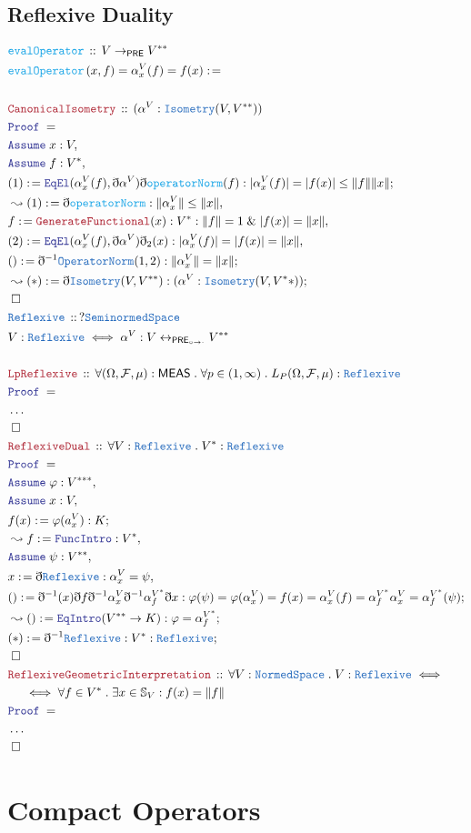 \documentclass[12pt]{scrartcl}
\newcommand{\TYPE}[1]{\textcolor{NavyBlue}{\mathtt{#1}}}
\newcommand{\FUNC}[1]{\textcolor{Cerulean}{\mathtt{#1}}}
\newcommand{\LOGIC}[1]{\textcolor{Blue}{\mathtt{#1}}}
\newcommand{\THM}[1]{\textcolor{Maroon}{\mathtt{#1}}}
\renewcommand{\.}{\; . \;}
\newcommand{\de}{: \kern 0.1pc =}
\newcommand{\Act}[1]{\left( #1 \right)}
\newcommand{\Theorem}[2]{& \THM{#1} \, :: \, #2 \\ & \Proof = \\ }
\newcommand{\DeclareType}[2]{& \TYPE{#1} \, :: \, #2 \\}
\newcommand{\DefineType}[3]{& #1 : \TYPE{#2} \iff #3 \\}
\newcommand{\DeclareFunc}[2]{& \FUNC{#1} \, :: \, #2 \\}
\newcommand{\DefineNamedFunc}[4]{&  \FUNC{#1}\Act{#2} = #3 \de #4 \\}
\newcommand{\NewLine}{\\ & \kern 1pc}
\newcommand{\Page}[1]{\begin{align*} #1 \end{align*} \newpage   }
\newcommand{ \bd }{ \ByDef }
\newcommand{\NoProof}{ & \ldots \\ \EndProof}
\renewcommand{\And}{\; \& \;}
\newcommand{\ToBij}{\leftrightarrow}
\newcommand{\Say}[3]{& #1 \de #2 : #3, \\}
\newcommand{\Conclude}[3]{& #1 \de #2 : #3; \\}
\newcommand{\Derive}[3]{& \leadsto #1 \de #2 : #3, \\}
\newcommand{\DeriveConclude}[3]{& \leadsto #1 \de #2 : #3 ; \\}
\newcommand{\A}{\LOGIC{Assume} \;}
\newcommand{\Assume}[2]{& \A #1 : #2, \\}
\newcommand{\QED}{\; \square}
\newcommand{\EndProof}{& \QED \\}
\newcommand{\ByDef}{\eth}
\newcommand{\Proof}{\LOGIC{Proof} \; }
\newcommand{\NS}{\TYPE{NormedSpace}} %
\newcommand{\SNS}{\TYPE{SeminormedSpace}} %
\newcommand{\PRE}{\mathsf{PRE}} %
\newcommand{\PREI}{\mathsf{PRE}_{\circ \to \cdot}} %
\newcommand{\MEAS}{\mathsf{MEAS}}
\newcommand{\F}{\mathcal{F}}
\renewcommand{\O}{\Omega}
\begin{document}
 \subsection{Reflexive Duality}
 \Page{
       \DeclareFunc{evalOperator}{V \to_\PRE V^{**}}
       \DefineNamedFunc{evalOperator}{x,f}{\alpha^V_x(f) =  f(x)}
       \\
       \Theorem{CanonicalIsometry}{ (\alpha^V : \TYPE{Isometry}(V,V^{**}))}
       \Assume{x}{V}
       \Assume{f}{V^*}
       \Conclude{(1)}{\LOGIC{EqEl}(\alpha^V_x(f),
       \bd \alpha^V)\bd \FUNC{operatorNorm}(f)}
       { | \alpha^V_x(f) | = | f(x) | \le \| f \| \| x \| }
       \Derive{(1)}{ \bd \FUNC{operatorNorm}}{ \| \alpha^V_x   \| \le \| x \| }
       \Say{f}{ \THM{GenerateFunctional}(x)}{V^* : \| f \| = 1 \And | f(x) | = \| x \|}
       \Say{(2)}{ \LOGIC{EqEl}(\alpha^V_x(f),
       \bd \alpha^V)\bd_2(x)  }{ | \alpha^V_x(f) | = | f(x) | = \| x \| }
       \Conclude{()}{ \bd^{-1} \TYPE{OperatorNorm}(1,2)  }{ \| \alpha^V_x \| = \| x \|  }
       \DeriveConclude{(*)}{\bd \TYPE{Isometry}(V,V^{**})}{ (\alpha^V : \TYPE{Isometry}(V,V^**))}
       \EndProof
       \DeclareType{Reflexive}{ ?\SNS}
       \DefineType{V}{Reflexive}{ \alpha^V : V \ToBij_{\PREI} V^{**}}
       \\
       \Theorem{LpReflexive}{ \forall (\O,\F,\mu) : \MEAS \. \forall p \in (1,\infty) \. 
       L_P(\O,\F,\mu)  : \TYPE{Reflexive}     
       }
        \NoProof
      \Theorem{ReflexiveDual}{\forall V : \TYPE{Reflexive} \. V^* : \TYPE{Reflexive}}
      \Assume{\varphi}{V^{***}}
      \Assume{x}{V}
      \Conclude{f(x)}{\varphi( a^V_x )}{K}
      \Derive{f}{\LOGIC{FuncIntro}}{V^*}
      \Assume{\psi }{V^{**}}
      \Say{x}{\bd \TYPE{Reflexive}}{\alpha^V_x = \psi}
      \Conclude{()}{ \bd^{-1}(x)\bd f \bd^{-1} \alpha^V_x \bd^{-1} \alpha^{V^*}_f \bd x    }{ \varphi(\psi) = \varphi( \alpha^V_x) = f(x) = \alpha^V_x(f) = \alpha^{V^*}_f\alpha^V_x = \alpha^{V^*}_f(\psi)}
  \DeriveConclude{()}{\LOGIC{EqIntro}(V^{**} \to K)}{\varphi = \alpha^{V^*}_f }
  \Conclude{(*)}{\bd^{-1} \TYPE{Reflexive}}{V^* : \TYPE{Reflexive}}
  \EndProof    
  \Theorem{ReflexiveGeometricInterpretation}{\forall V : \NS \. V : \TYPE{Reflexive} \iff
    \NewLine \iff  
   \forall 
  f \in V^* \. \exists x \in \mathbb{S}_V : f(x) = \| f \|}
  \NoProof
 }
\section{Compact Operators}
\end{document}
